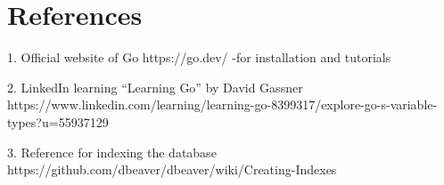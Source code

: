 \documentclass{article}
\begin{document}
\clearpage
\section{References}

1. Official website of Go https://go.dev/
-for installation and tutorials

2. LinkedIn learning “Learning Go” by David Gassner
https://www.linkedin.com/learning/learning-go-8399317/explore-go-s-variable-types?u=55937129

3. Reference for indexing the database
https://github.com/dbeaver/dbeaver/wiki/Creating-Indexes
\end{document}
